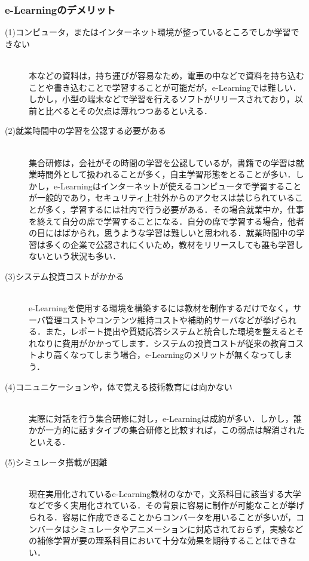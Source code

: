 \documentclass[a4j,12pt]{jsarticle}
\begin{document}
\subsubsection{e-Learningのデメリット}
\begin{description} 

\item[(1)コンピュータ，またはインターネット環境が整っているところでしか学習できない]\mbox{}\\ 
本などの資料は，持ち運びが容易なため，電車の中などで資料を持ち込むことや書き込むことで学習することが可能だが，e-Learningでは難しい．しかし，小型の端末などで学習を行えるソフトがリリースされており，以前と比べるとその欠点は薄れつつあるといえる．

\item[(2)就業時間中の学習を公認する必要がある]\mbox{}\\ 
集合研修は，会社がその時間の学習を公認しているが，書籍での学習は就業時間外として扱われることが多く，自主学習形態をとることが多い．しかし，e-Learningはインターネットが使えるコンピュータで学習することが一般的であり，セキュリティ上社外からのアクセスは禁じられていることが多く，学習するには社内で行う必要がある．その場合就業中か，仕事を終えて自分の席で学習することになる．自分の席で学習する場合，他者の目にはばかられ，思うような学習は難しいと思われる．就業時間中の学習は多くの企業で公認されにくいため，教材をリリースしても誰も学習しないという状況も多い．

\item[(3)システム投資コストがかかる]\mbox{}\\ 
e-Learningを使用する環境を構築するには教材を制作するだけでなく，サーバ管理コストやコンテンツ維持コストや補助的サーバなどが挙げられる．また，レポート提出や質疑応答システムと統合した環境を整えるとそれなりに費用がかかってします．システムの投資コストが従来の教育コストより高くなってしまう場合，e-Learningのメリットが無くなってしまう．

\item[(4)コニュニケーションや，体で覚える技術教育には向かない]\mbox{}\\
実際に対話を行う集合研修に対し，e-Learningは成約が多い．しかし，誰かが一方的に話すタイプの集合研修と比較すれば，この弱点は解消されたといえる．

\item[(5)シミュレータ搭載が困難]\mbox{}\\
 現在実用化されているe-Learning教材のなかで，文系科目に該当する大学などで多く実用化されている．その背景に容易に制作が可能なことが挙げられる．容易に作成できることからコンバータを用いることが多いが，コンバータはシミュレータやアニメーションに対応されておらず，実験などの補修学習が要の理系科目において十分な効果を期待することはできない．
\end{description}
\newpage
\end{document}
